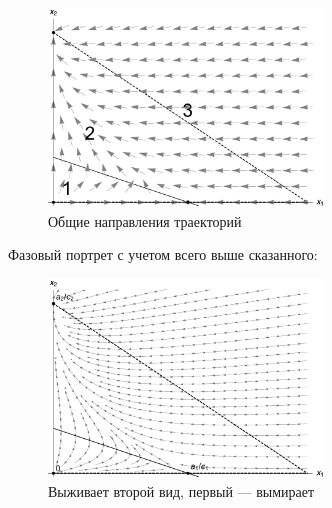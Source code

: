 \documentclass[12pt,a4paper]{article}
\begin{document}

    
    \begin{figure}[h]
        \centering
        \includegraphics[width=0.65\textwidth]{areas_4.pdf}
        \caption{Общие направления траекторий}
        \label{fig:areas_4}
    \end{figure}

    \pagebreak

    Фазовый портрет с учетом всего выше сказанного:
    \begin{figure}[h]
        \centering
        \includegraphics[width=0.65\textwidth]{phase_4.pdf}
        \caption{Выживает второй вид, первый --- вымирает}
        \label{fig:phase_4}
    \end{figure}
    
\end{document}
